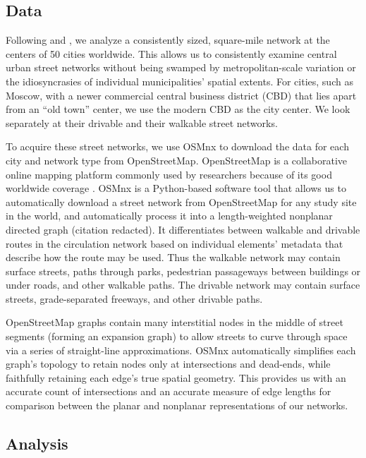 \documentclass[Afour,sageh,times]{sagej}
\begin{document}
\subsection{Data}

Following \citet{jacobs_great_1995} and \citet{cardillo_structural_2006}, we analyze a consistently sized, square-mile network at the centers of 50 cities worldwide. This allows us to consistently examine central urban street networks without being swamped by metropolitan-scale variation or the idiosyncrasies of individual municipalities' spatial extents. For cities, such as Moscow, with a newer commercial central business district (CBD) that lies apart from an \enquote{old town} center, we use the modern CBD as the city center. We look separately at their drivable and their walkable street networks.

To acquire these street networks, we use OSMnx to download the data for each city and network type from OpenStreetMap. OpenStreetMap is a collaborative online mapping platform commonly used by researchers because of its good worldwide coverage \citep{haklay_how_2010,jokar_arsanjani_openstreetmap_2015}. OSMnx is a Python-based software tool that allows us to automatically download a street network from OpenStreetMap for any study site in the world, and automatically process it into a length-weighted nonplanar directed graph (citation redacted). It differentiates between walkable and drivable routes in the circulation network based on individual elements' metadata that describe how the route may be used. Thus the walkable network may contain surface streets, paths through parks, pedestrian passageways between buildings or under roads, and other walkable paths. The drivable network may contain surface streets, grade-separated freeways, and other drivable paths.

OpenStreetMap graphs contain many interstitial nodes in the middle of street segments (forming an expansion graph) to allow streets to curve through space via a series of straight-line approximations. OSMnx automatically simplifies each graph's topology to retain nodes only at intersections and dead-ends, while faithfully retaining each edge's true spatial geometry. This provides us with an accurate count of intersections and an accurate measure of edge lengths for comparison between the planar and nonplanar representations of our networks.

\subsection{Analysis}
\end{document}
